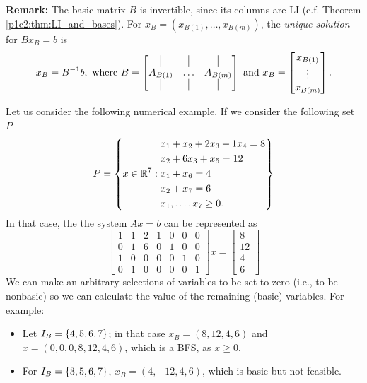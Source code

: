 {\bf Remark:} The basic matrix $B$ is invertible, since its columns are LI (c.f. Theorem \ref{p1c2:thm:LI_and_bases}). For $x_B = (x_{B(1)}, \dots, x_{B(m)})$, the \emph{unique solution} for $Bx_B = b$ is 
%
\begin{equation*}
	x_B = B^{-1}b, \text{ where } 
	B = \begin{bmatrix} \vline & \vline & \vline \\
					  A_{B(1)} & \dots & A_{B(m)} \\
	    	    		\vline & \vline & \vline	
		\end{bmatrix} \text{ and } 
	x_B =  \begin{bmatrix}   x_{B(1)} \\
		 			     		 \vdots   \\
		 			     		 x_{B(m)}	
		   \end{bmatrix}.
\end{equation*}
%

Let us consider the following numerical example. If we consider the following set $P$
%
\begin{equation}
	P = \left\{x \in \mathbb{R}^7 :  
		\begin{aligned}
			& x_1 + x_2 + 2x_3 + 1x_4 = 8 \\
			& x_2 + 6 x_3 + x_5 = 12 \\
			& x_1 + x_6 = 4 \\
			& x_2 + x_7 =6 \\
			& x_1, \dots, x_7 \ge 0.
		\end{aligned}
		\right\} 	
\end{equation} \label{p1c3:eq:example_P}
%
In that case, the the system $Ax=b$ can be represented as 
%  
\begin{equation*}
	\begin{bmatrix}
		1 & 1 & 2 & 1 & 0 & 0 & 0 \\
		0 & 1 & 6 & 0 & 1 & 0 & 0 \\
		1 & 0 & 0 & 0 & 0 & 1 & 0 \\
		0 & 1 & 0 & 0 & 0 & 0 & 1
	\end{bmatrix} x =
	\begin{bmatrix}
		8  \\
		12 \\
		4  \\
		6   	
	\end{bmatrix}
\end{equation*}
%
We can make an arbitrary selections of variables to be set to zero (i.e., to be nonbasic) so we can calculate the value of the remaining (basic) variables. For example:
\begin{itemize}
	\item Let $I_B = \left\{ 4, 5, 6, 7 \right \}$; in that case $x_B = (8,12,4,6)$ and $x = (0,0,0,8,12,4,6)$, which is a BFS, as $x \geq 0$.

	\item For $I_B = \left\{ 3,5,6,7 \right \}$, $x_B = (4,-12,4,6)$, which is basic but not feasible.	
\end{itemize}


